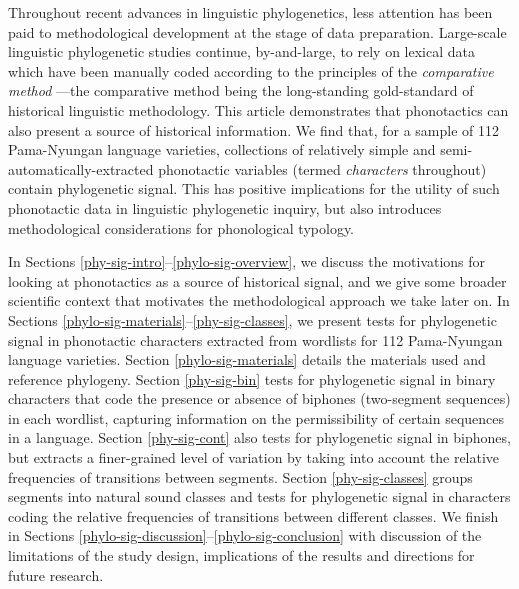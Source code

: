 Throughout recent advances in linguistic phylogenetics, less attention has been paid to methodological development at the stage of data preparation. Large-scale linguistic phylogenetic studies \autocites[e.g.][]{chang_ancestry-constrained_2015}{bouckaert_origin_2018}{kolipakam_bayesian_2018} continue, by-and-large, to rely on lexical data which have been manually coded according to the principles of the \emph{comparative method} \autocites[as described by][]{meillet_methode_1925}{durie_comparative_1996}{campbell_historical_2004}{weiss_comparative_2014}---the comparative method being the long-standing gold-standard of historical linguistic methodology. This article demonstrates that phonotactics can also present a source of historical information. We find that, for a sample of 112 Pama-Nyungan language varieties, collections of relatively simple and semi-automatically-extracted phonotactic variables (termed \emph{characters} throughout) contain phylogenetic signal. This has positive implications for the utility of such phonotactic data in linguistic phylogenetic inquiry, but also introduces methodological considerations for phonological typology.

In Sections \ref{phy-sig-intro}--\ref{phylo-sig-overview}, we discuss the motivations for looking at phonotactics as a source of historical signal, and we give some broader scientific context that motivates the methodological approach we take later on. In Sections \ref{phylo-sig-materials}--\ref{phy-sig-classes}, we present tests for phylogenetic signal in phonotactic characters extracted from wordlists for 112 Pama-Nyungan language varieties. Section \ref{phylo-sig-materials} details the materials used and reference phylogeny. Section \ref{phy-sig-bin} tests for phylogenetic signal in binary characters that code the presence or absence of biphones (two-segment sequences) in each wordlist, capturing information on the permissibility of certain sequences in a language. Section \ref{phy-sig-cont} also tests for phylogenetic signal in biphones, but extracts a finer-grained level of variation by taking into account the relative frequencies of transitions between segments. Section \ref{phy-sig-classes} groups segments into natural sound classes and tests for phylogenetic signal in characters coding the relative frequencies of transitions between different classes. We finish in Sections \ref{phylo-sig-discussion}--\ref{phylo-sig-conclusion} with discussion of the limitations of the study design, implications of the results and directions for future research.

